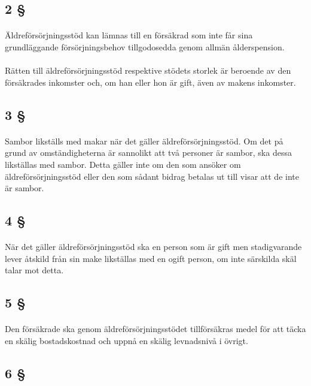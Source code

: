 \documentclass[a4paper,notitlepage,openany,10pt]{book}
\begin{document}
\subsection*{2 §}
\paragraph*{}
Äldreförsörjningsstöd kan lämnas till en försäkrad som inte får sina grundläggande försörjningsbehov tillgodosedda genom allmän ålderspension.
\paragraph*{}
Rätten till äldreförsörjningsstöd respektive stödets storlek är beroende av den försäkrades inkomster och, om han eller hon är gift, även av makens inkomster.
\subsection*{3 §}
\paragraph*{}
Sambor likställs med makar när det gäller äldreförsörjningsstöd. Om det på grund av omständigheterna är sannolikt att två personer är sambor, ska dessa likställas med sambor. Detta gäller inte om den som ansöker om äldreförsörjningsstöd eller den som sådant bidrag betalas ut till visar att de inte är sambor.
\subsection*{4 §}
\paragraph*{}
När det gäller äldreförsörjningsstöd ska en person som är gift men stadigvarande lever åtskild från sin make likställas med en ogift person, om inte särskilda skäl talar mot detta.
\subsection*{5 §}
\paragraph*{}
Den försäkrade ska genom äldreförsörjningsstödet tillförsäkras medel för att täcka en skälig bostadskostnad och uppnå en skälig levnadsnivå i övrigt.
\subsection*{6 §}
\end{document}
